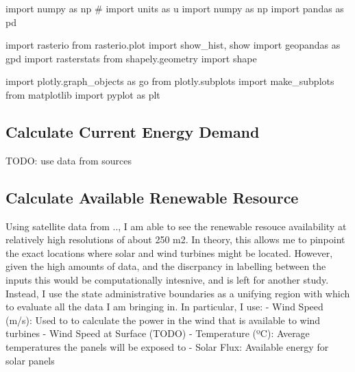 \documentclass[
  letterpaper,
  DIV=11,
  numbers=noendperiod]{scrartcl}
\newenvironment{Shaded}{\begin{snugshade}}{\end{snugshade}}
\newcommand{\CommentTok}[1]{\textcolor[rgb]{0.37,0.37,0.37}{#1}}
\newcommand{\ImportTok}[1]{\textcolor[rgb]{0.00,0.46,0.62}{#1}}
\newcommand{\NormalTok}[1]{\textcolor[rgb]{0.00,0.23,0.31}{#1}}
\begin{document}
\begin{Shaded}
\begin{Highlighting}[]
\ImportTok{import}\NormalTok{ numpy }\ImportTok{as}\NormalTok{ np}
\CommentTok{\# import units as u}
\ImportTok{import}\NormalTok{ numpy }\ImportTok{as}\NormalTok{ np}
\ImportTok{import}\NormalTok{ pandas }\ImportTok{as}\NormalTok{ pd}

\ImportTok{import}\NormalTok{ rasterio}
\ImportTok{from}\NormalTok{ rasterio.plot }\ImportTok{import}\NormalTok{ show\_hist, show}
\ImportTok{import}\NormalTok{ geopandas }\ImportTok{as}\NormalTok{ gpd}
\ImportTok{import}\NormalTok{ rasterstats}
\ImportTok{from}\NormalTok{ shapely.geometry }\ImportTok{import}\NormalTok{ shape}

\ImportTok{import}\NormalTok{ plotly.graph\_objects }\ImportTok{as}\NormalTok{ go}
\ImportTok{from}\NormalTok{ plotly.subplots }\ImportTok{import}\NormalTok{ make\_subplots}
\ImportTok{from}\NormalTok{ matplotlib }\ImportTok{import}\NormalTok{ pyplot }\ImportTok{as}\NormalTok{ plt}
\end{Highlighting}
\end{Shaded}

\hypertarget{calculate-current-energy-demand}{%
\subsection{Calculate Current Energy
Demand}\label{calculate-current-energy-demand}}

TODO: use data from sources

\hypertarget{calculate-available-renewable-resource}{%
\subsection{Calculate Available Renewable
Resource}\label{calculate-available-renewable-resource}}

Using satellite data from .., I am able to see the renewable resouce
availability at relatively high resolutions of about 250 m2. In theory,
this allows me to pinpoint the exact locations where solar and wind
turbines might be located. However, given the high amounts of data, and
the discrpancy in labelling between the inputs this would be
computationally intesnive, and is left for another study. Instead, I use
the state administrative boundaries as a unifying region with which to
evaluate all the data I am bringing in. In particular, I use: - Wind
Speed (m/s): Used to to calculate the power in the wind that is
available to wind turbines - Wind Speed at Surface (TODO) - Temperature
(ºC): Average temperatures the panels will be exposed to - Solar Flux:
Available energy for solar panels
\end{document}
